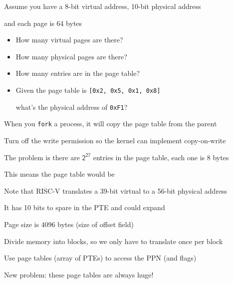 \begin{slide}


    Assume you have a 8-bit virtual address, 10-bit physical address

    \leftspace{}and each page is 64 bytes
    \medskip

    \begin{itemize}
      \item How many virtual pages are there? 
      \item How many physical pages are there? 
      \item How many entries are in the page table? 
      \item Given the page table is \texttt{{[0x2, 0x5, 0x1, 0x8]}}

            \hspace{2em} what's the physical address of \texttt{0xF1}?

    \end{itemize}

\end{slide}

\begin{slide}

\end{slide}

\begin{slide}


    When you \texttt{fork} a process, it will copy the page table from the parent

    \leftspace{}Turn off the write permission so the kernel can implement
    copy-on-write
    \medskip

    The problem is there are $\mathsf{2^{27}}$ entries in the page table, each
    one is 8 bytes

    \leftspace{}This means the page table would be 
    \medskip

    Note that RISC-V translates a 39-bit virtual to a 56-bit physical address

    \leftspace{}It has 10 bits to spare in the PTE and could expand

    \leftspace{}Page size is 4096 bytes (size of offset field)

\end{slide}

\begin{slide}


    Divide memory into blocks, so we only have to translate once per block
    \medskip

    Use page tables (array of PTEs) to access the PPN (and flags)
    \medskip

    New problem: these page tables are always huge!

\end{slide}
  

